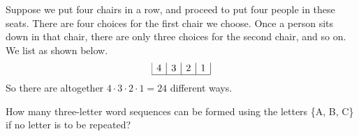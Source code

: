 \begin{solution}
    Suppose we put four chairs in a row, and proceed to put four people in these seats. There are four choices for the first chair we choose. Once a person sits down in that chair, there are only three choices for the second chair, and so on. We list as shown below.
    \[
        \begin{array}{|c|c|c|c|}
            4 & 3 & 2 & 1 \\
            \hline
        \end{array}
    \]
    So there are altogether \( 4 \cdot 3 \cdot 2 \cdot 1 = 24 \) different ways.
\end{solution}

\begin{example}
    How many three-letter word sequences can be formed using the letters \{A, B, C\} if no letter is to be repeated?
\end{example}

